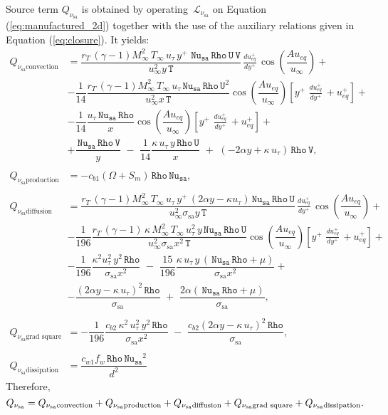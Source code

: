 \documentclass[10pt]{article}
\newcommand{\Rho}{\,\mathtt{Rho}}
\newcommand{\U}{\,\mathtt{U}}
\newcommand{\V}{\,\mathtt{V}}
\newcommand{\Nu}{\,\mathtt{Nu_{sa}}}
\newcommand{\T}{\,\mathtt{T}}
\newcommand{\Lo}{\,\mathcal{L}}
\newcommand{\Dueqplusyplus}{\, \frac{du_{eq}^+}{dy^+}\,}
\newcommand{\sa}{\nu_{\mathrm{sa}}}
\newcommand{\tsa}{\mathrm{sa}}
\begin{document}
Source term $Q_{\sa}$ is obtained by operating $\Lo_{\sa }$ on Equation  (\ref{eq:manufactured_2d}) together with the use of the  auxiliary relations given in Equation (\ref{eq:closure}). It yields:
\begin{equation}
 \begin{split}
Q_{\sa \text{convection}} &= \dfrac{r_T \, (\gamma-1) M_{\infty}^2 \, T_{\infty} \,   u_{\tau}\, y^{+} \, \Nu \Rho \U \V}{u_{\infty}^2 y \T}\Dueqplusyplus  \cos\left(\dfrac{A u_{eq}}{u_{\infty}}\right)+\\
  &-\dfrac{1}{14} \dfrac{r_T \, (\gamma-1) M_{\infty}^2 \, T_{\infty} \,  u_{\tau} \Nu \Rho \U^2 }{u_{\infty}^2 x \T}\cos\left(\dfrac{A u_{eq}}{u_{\infty}}\right)\left[y^{+} \, \Dueqplusyplus+u_{eq}^{+} \right] +\\
  &-\dfrac{1}{14}\dfrac{ u_{\tau} \Nu \Rho }{x}\cos\left(\dfrac{A u_{eq}}{u_{\infty}}\right)\left[y^{+} \, \Dueqplusyplus+u_{eq}^{+} \right] +\\
  &+\dfrac{\Nu \Rho \V}{y} \,\, - \,\, \dfrac{1}{14} \dfrac{\kappa \, u_{\tau} \, y  \Rho \U}{x}\,\, +\,\, (-2 \alpha y+ \kappa \, u_{\tau}) \Rho \V , \\
%
&\\
%
Q_{\sa \text{production}} &= -c_{b1} (\Omega+S_m) \Rho \Nu , \\
%
&\\
%
Q_{\sa \text{diffusion}} &=\dfrac{ r_T \, (\gamma-1) M_{\infty}^2 \, T_{\infty} \,   u_{\tau} \,  y^{+} \,(2 \alpha y- \kappa   u_{\tau}) \Nu \Rho \U }{u_{\infty}^2 \sigma_{\tsa} y \T} \Dueqplusyplus \cos\left(\dfrac{A u_{eq}}{u_{\infty}}\right)+\\
  &-\dfrac{1}{196} \dfrac{ r_T \, (\gamma-1) \, \kappa \,   M_{\infty}^2 \, T_{\infty} \,  u_{\tau}^2 \, y \Nu \Rho \U}{u_{\infty}^2 \sigma_{\tsa} x^2 \T} \cos\left(\dfrac{A u_{eq}}{u_{\infty}}\right)\left[y^{+} \, \Dueqplusyplus+u_{eq}^{+} \right]+\\
  &-\dfrac{1}{196} \dfrac{ \kappa^2 u_{\tau}^2 \,  y^2 \Rho}{\sigma_{\tsa} x^2} \,\,- \,\, \dfrac{15}{196} \dfrac{ \kappa \, u_{\tau} \, y \, (\Nu \Rho+\mu)  }{\sigma_{\tsa} x^2}+\\
  &-\dfrac{(2 \alpha y- \kappa \,  u_{\tau})^2 \Rho}{\sigma_{\tsa}} \,\,+ \,\, \dfrac{2 \alpha (\Nu \Rho+\mu)}{\sigma_{\tsa}} , \\
%
&\\
%
Q_{\sa \text{grad square}} &= -\dfrac{1}{196} \dfrac{c_{b2} \, \kappa^2 \, u_{\tau}^2 \, y^2 \Rho}{\sigma_{\tsa} x^2}\,\,- \,\, \dfrac{c_{b2} (2 \alpha y- \kappa \,  u_{\tau})^2 \Rho}{\sigma_{\tsa}} , \\
%
&\\
%
Q_{\sa \text{dissipation}} &= \dfrac{c_{w1} f_w \Rho \Nu^2}{d^2}
%
\end{split}
\end{equation}
Therefore, 
\begin{equation}
Q_{\sa}= Q_{\sa \text{convection}} +Q_{\sa \text{production}}+Q_{\sa \text{diffusion}}+Q_{\sa \text{grad square}}+Q_{\sa \text{dissipation}}.\\
\end{equation}
\end{document}
